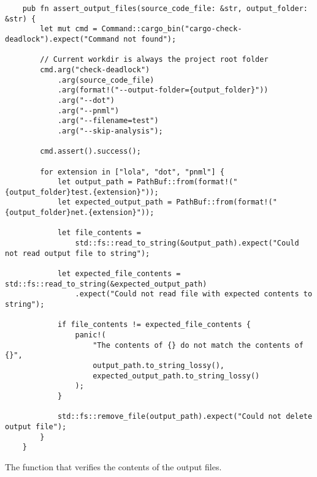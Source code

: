 \begin{listing}[!htbp]
    \begin{verbatim}
    pub fn assert_output_files(source_code_file: &str, output_folder: &str) {
        let mut cmd = Command::cargo_bin("cargo-check-deadlock").expect("Command not found");
    
        // Current workdir is always the project root folder
        cmd.arg("check-deadlock")
            .arg(source_code_file)
            .arg(format!("--output-folder={output_folder}"))
            .arg("--dot")
            .arg("--pnml")
            .arg("--filename=test")
            .arg("--skip-analysis");
    
        cmd.assert().success();
    
        for extension in ["lola", "dot", "pnml"] {
            let output_path = PathBuf::from(format!("{output_folder}test.{extension}"));
            let expected_output_path = PathBuf::from(format!("{output_folder}net.{extension}"));
    
            let file_contents =
                std::fs::read_to_string(&output_path).expect("Could not read output file to string");
    
            let expected_file_contents = std::fs::read_to_string(&expected_output_path)
                .expect("Could not read file with expected contents to string");
    
            if file_contents != expected_file_contents {
                panic!(
                    "The contents of {} do not match the contents of {}",
                    output_path.to_string_lossy(),
                    expected_output_path.to_string_lossy()
                );
            }
    
            std::fs::remove_file(output_path).expect("Could not delete output file");
        }
    }
    \end{verbatim}
    \caption{The function that verifies the contents of the output files.}
    \label{lst:assert-output-files}
\end{listing}

